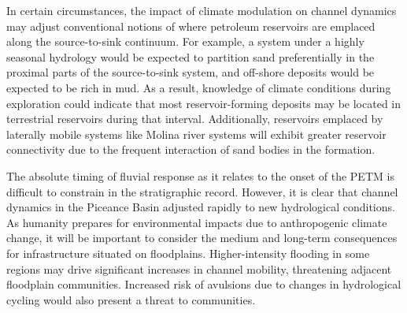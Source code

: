 \documentclass[draft]{compact_proposal}
\begin{document}
In certain circumstances, the impact of climate modulation on channel dynamics may adjust conventional notions of where petroleum reservoirs are emplaced along the source-to-sink continuum.
For example, a system under a highly seasonal hydrology would be expected to partition sand preferentially in the proximal parts of the source-to-sink system, and off-shore deposits would be expected to be rich in mud.
As a result, knowledge of climate conditions during exploration could indicate that most reservoir-forming deposits may be located in terrestrial reservoirs during that interval.
Additionally, reservoirs emplaced by laterally mobile systems like Molina river systems will exhibit greater reservoir connectivity due to the frequent interaction of sand bodies in the formation.

The absolute timing of fluvial response as it relates to the onset of the PETM is difficult to constrain in the stratigraphic record.
However, it is clear that channel dynamics in the Piceance Basin adjusted rapidly to new hydrological conditions.
As humanity prepares for environmental impacts due to anthropogenic climate change, it will be important to consider the medium and long-term consequences for infrastructure situated on floodplains.
Higher-intensity flooding in some regions may drive significant increases in channel mobility, threatening adjacent floodplain communities.
Increased risk of avulsions due to changes in hydrological cycling would also present a threat to communities.


\end{document}
